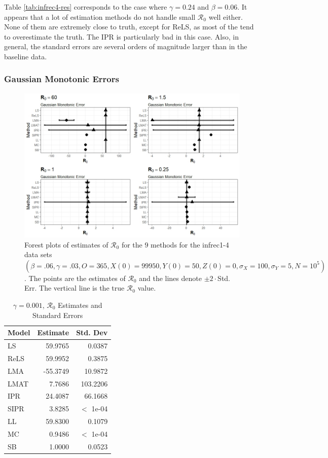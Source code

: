 \documentclass[12pt]{article}
\newcommand{\xxsir}{\ensuremath{9} } %
\newcommand{\rr}{\ensuremath{\mathcal{R}_0}}
\begin{document}
Table \ref{tab:infrec4-res} corresponds to the case where $\gamma = 0.24$ and $\beta=0.06$. It appears that a lot of estimation methods do not handle small $\rr$ well either. None of them are extremely close to truth, except for ReLS, as most of the tend to overestimate the truth. The IPR is particularly bad in this case. Also, in general, the standard errors are several orders of magnitude larger than in the baseline data.

\subsubsection{Gaussian Monotonic Errors}

\begin{figure}[H]
	\centering
	\includegraphics[scale=0.5]{images/parchange_nm.jpeg}
	\caption{Forest plots of estimates of $\rr$ for the \xxsir methods for the infrec1-4 data sets $(\beta=.06, \gamma=.03, O=365, X(0)=99950, Y(0)=50, Z(0)=0, \sigma_X=100, \sigma_Y=5, N=10^5)$.  The points are the estimates of $\rr$ and the lines denote $\pm 2\cdot $Std. Err.  The vertical line is the true $\rr$ value.}
\end{figure}
\begin{table}[H]
	
	\centering
	\begin{tabular}[t]{l|r|r}
		\hline
		Model & Estimate & Std. Dev\\
		\hline
		LS & 59.9765 & 0.0387\\
		\hline
		ReLS & 59.9952 & 0.3875\\
		\hline
		LMA & -55.3749 & 10.9872\\
		\hline
		LMAT & 7.7686 & 103.2206\\
		\hline
		IPR & 24.4087 & 66.1668\\
		\hline
		SIPR & 3.8285 & $<$ 1e-04\\
		\hline
		LL & 59.8300 & 0.1079\\
		\hline
		MC & 0.9486 & $<$ 1e-04\\
		\hline
		SB & 1.0000 & 0.0523\\
		\hline
	\end{tabular}
	\caption{$\gamma = 0.001$, $\rr$ Estimates and Standard Errors}
\end{table}
\end{document}
